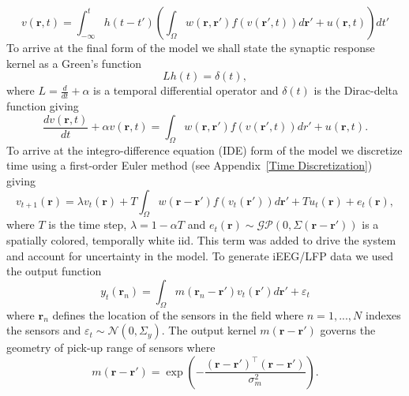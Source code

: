 \documentclass[onecolumn,draftcls]{IEEEtran}
\begin{document}
\begin{equation}\label{FullDoubleIntModel}
	v\left(\mathbf{r},t\right) = \int_{-\infty}^t h\left(t - t'\right) \left(\int_\Omega   w\left(\mathbf{r},\mathbf{r}'\right) f\left( v\left( \mathbf{r}',t \right)\right)d\mathbf{r}' + u(\mathbf{r},t) \right)dt'
\end{equation}
To arrive at the final form of the model we shall state the synaptic response kernel as a Green's function
\begin{equation}\label{GreensFuncDef}
	Lh\left( t \right) = \delta \left( t \right),
\end{equation}
where $L=\frac{d}{dt} + \alpha$ is a temporal differential operator and $\delta(t)$ is the Dirac-delta function giving 
\begin{equation}\label{FinalFormContinuous}
	\frac{dv\left( \mathbf{r},t \right)}{dt} + \alpha v\left( \mathbf{r},t \right) = \int_\Omega  {w\left( \mathbf{r},\mathbf{r}' \right)f\left( {v\left( \mathbf{r}',t \right)} \right)dr'} + u\left(\mathbf{r},t\right).
\end{equation}
To arrive at the integro-difference equation (IDE) form of the model we discretize time using a first-order Euler method (see Appendix~\ref{Time Discretization}) giving
\begin{equation}\label{DiscreteTimeModel}
	v_{t+1}\left(\mathbf{r}\right) = \lambda v_t\left(\mathbf{r}\right) + T \int_\Omega { w\left(\mathbf{r}-\mathbf{r}'\right) f\left(v_t\left(\mathbf{r}'\right)\right) d\mathbf{r}'} + T u_t\left(\mathbf{r}\right) + e_t\left(\mathbf{r}\right),
\end{equation} 
where $T$ is the time step, $\lambda = 1-\alpha T$ and $e_t(\mathbf{r}) \sim \mathcal{GP}\left(0,\Sigma\left(\mathbf{r}-\mathbf{r}'\right)\right)$ 
is a spatially colored, temporally white iid. This term was added to drive the system and account for uncertainty in the model. To generate iEEG/LFP data we used the output function 
\begin{equation}
	y_t(\mathbf{r}_n) = \int_{\Omega}{m\left(\mathbf{r}_n-\mathbf{r}'\right)v_t\left(\mathbf{r}'\right)d\mathbf{r}'} + \varepsilon_t
\end{equation}
where $\mathbf{r}_n$ defines the location of the sensors in the field where $n=1,...,N$ indexes the sensors and $\varepsilon_t \sim \mathcal{N}\left(0,\Sigma_y\right)$. The output kernel $m(\mathbf{r}-\mathbf{r}')$ governs the geometry of pick-up range of sensors where
\begin{equation}
	m\left(\mathbf{r}-\mathbf{r}'\right) = \exp{\left(-\frac{(\mathbf{r}-\mathbf{r}')^\top(\mathbf{r}-\mathbf{r}')}{\sigma_m^2}\right)}.
\end{equation}
\end{document}
